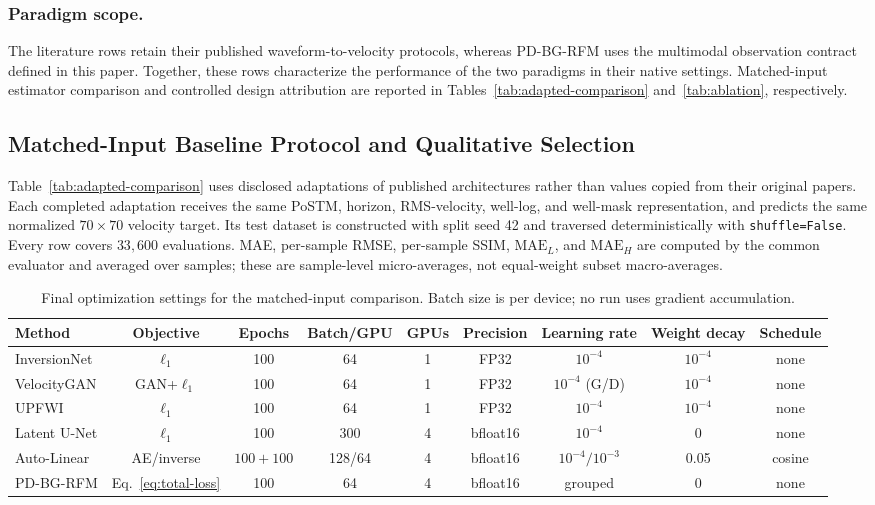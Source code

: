 \documentclass[letterpaper]{article}
\begin{document}
\subsubsection{Paradigm scope.}
The literature rows retain their published waveform-to-velocity protocols, whereas PD-BG-RFM uses the multimodal observation contract defined in this paper. Together, these rows characterize the performance of the two paradigms in their native settings. Matched-input estimator comparison and controlled design attribution are reported in Tables~\ref{tab:adapted-comparison} and~\ref{tab:ablation}, respectively.


\subsection{Matched-Input Baseline Protocol and Qualitative Selection}
\label{app:adapted-accounting}
Table~\ref{tab:adapted-comparison} uses disclosed adaptations of published architectures rather than values copied from their original papers. Each completed adaptation receives the same PoSTM, horizon, RMS-velocity, well-log, and well-mask representation, and predicts the same normalized $70\times70$ velocity target. Its test dataset is constructed with split seed 42 and traversed deterministically with \texttt{shuffle=False}. Every row covers $33{,}600$ evaluations. MAE, per-sample RMSE, per-sample SSIM, $\mathrm{MAE}_L$, and $\mathrm{MAE}_H$ are computed by the common evaluator and averaged over samples; these are sample-level micro-averages, not equal-weight subset macro-averages.

\begin{table}[t]
\centering
\small
\begin{tabular}{@{}lcccccccc@{}}
\toprule
Method & Objective & Epochs & Batch/GPU & GPUs & Precision & Learning rate & Weight decay & Schedule \\
\midrule
InversionNet & $\ell_1$ & 100 & 64 & 1 & FP32 & $10^{-4}$ & $10^{-4}$ & none \\
VelocityGAN & GAN+$\ell_1$ & 100 & 64 & 1 & FP32 & $10^{-4}$ (G/D) & $10^{-4}$ & none \\
UPFWI & $\ell_1$ & 100 & 64 & 1 & FP32 & $10^{-4}$ & $10^{-4}$ & none \\
Latent U-Net & $\ell_1$ & 100 & 300 & 4 & bfloat16 & $10^{-4}$ & 0 & none \\
Auto-Linear & AE/inverse & $100+100$ & 128/64 & 4 & bfloat16 & $10^{-4}/10^{-3}$ & 0.05 & cosine \\
PD-BG-RFM & Eq.~\ref{eq:total-loss} & 100 & 64 & 4 & bfloat16 & grouped & 0 & none \\
\bottomrule
\end{tabular}
\caption{Final optimization settings for the matched-input comparison. Batch size is per device; no run uses gradient accumulation.}
\label{tab:final-optimization}
\end{table}
\end{document}

